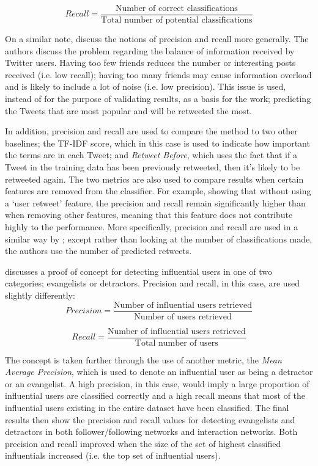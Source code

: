 \[
	Recall = \frac{\text{Number of correct classifications}}{\text{Total number of potential classifications}}
\]

On a similar note, \citet{hong11} discuss the notions of precision and recall more generally. The authors discuss the problem regarding the balance of information received by Twitter users. Having too few friends reduces the number or interesting posts received (i.e. low recall); having too many friends may cause information overload and is likely to include a lot of noise (i.e. low precision). This issue is used, instead of for the purpose of validating results, as a basis for the work; predicting the Tweets that are most popular and will be retweeted the most.

In addition, precision and recall are used to compare the method to two other baselines; the TF-IDF score, which in this case is used to indicate how important the terms are in each Tweet; and \emph{Retweet Before}, which uses the fact that if a Tweet in the training data has been previously retweeted, then it's likely to be retweeted again. The two metrics are also used to compare results when certain features are removed from the classifier. For example, showing that without using a `user retweet' feature, the precision and recall remain significantly higher than when removing other features, meaning that this feature does not contribute highly to the performance. More specifically, precision and recall are used in a similar way by \citet{castillo11}; except rather than looking at the number of classifications made, the authors use the number of predicted retweets.

\cite{bigonha10} discusses a proof of concept for detecting influential users in one of two categories; evangelists or detractors. Precision and recall, in this case, are used slightly differently:
\[	
	Precision = \frac{\text{Number of influential users retrieved}}{\text{Number of users retrieved}}
\]

\[
	Recall = \frac{\text{Number of influential users retrieved}}{\text{Total number of users}}
\]

The concept is taken further through the use of another metric, the \emph{Mean Average Precision}, which is used to denote an influential user as being a detractor or an evangelist. A high precision, in this case, would imply a large proportion of influential users are classified correctly and a high recall means that most of the influential users existing in the entire dataset have been classified. The final results then show the precision and recall values for detecting evangelists and detractors in both follower/following networks and interaction networks. Both precision and recall improved when the size of the set of highest classified influentials increased (i.e. the top set of influential users).

